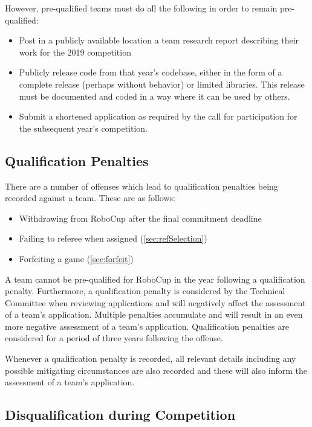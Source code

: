 However, pre-qualified teams must do all the following in order to remain pre-qualified:
\begin{itemize}
\item Post in a publicly available location a team research report describing their work for the 2019 competition
\item Publicly release code from that year's codebase, either in the form of a complete release (perhaps without behavior) or limited libraries.  This release must be documented and coded in a way where it can be used by others.
\item Submit a shortened application as required by the call for participation for the subsequent year's competition.
\end{itemize}

\subsection{Qualification Penalties}
\label{sec:qualificationPenalties}

There are a number of offenses which lead to qualification penalties being recorded against a team. These are as follows:
\begin{itemize}
    \item Withdrawing from RoboCup after the final commitment deadline
    \item Failing to referee when assigned (\cref{sec:refSelection})
    \item Forfeiting a game (\cref{sec:forfeit})
\end{itemize}

A team cannot be pre-qualified for RoboCup in the year following a qualification penalty. Furthermore, a qualification penalty is considered by the Technical Committee when reviewing applications and will negatively affect the assessment of a team's application. Multiple penalties accumulate and will result in an even more negative assessment of a team's application. Qualification penalties are considered for a period of three years following the offense.

Whenever a qualification penalty is recorded, all relevant details including any possible mitigating circumstances are also recorded and these will also inform the assessment of a team's application.

\subsection{Disqualification during Competition}
\label{sec:disqualification_during_comp}

